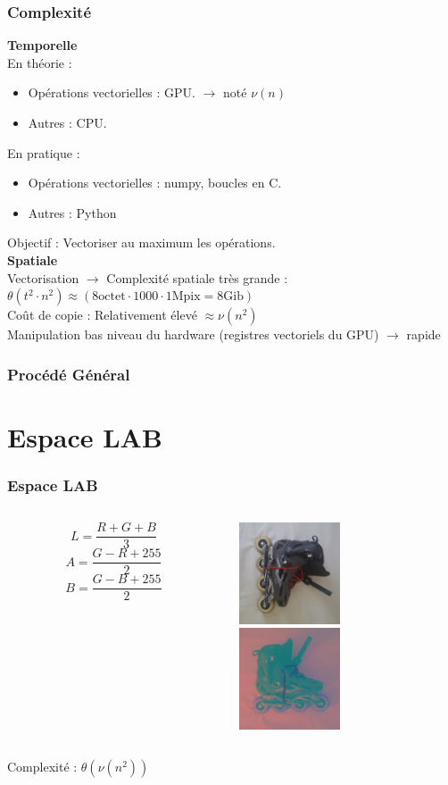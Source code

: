 \documentclass[french]{beamer}
\begin{document}
\begin{frame}
	\frametitle{Complexité}
	\textbf{Temporelle} \\
	\smallskip
	En théorie :
	\begin{itemize}
		\item Opérations vectorielles : GPU. \;\;\; $\longrightarrow$ noté $\nu(n)$
		\item Autres : CPU.
	\end{itemize}
	En pratique :
	\begin{itemize}
		\item Opérations vectorielles : numpy, boucles en C.
		\item Autres : Python
	\end{itemize}
	Objectif : Vectoriser au maximum les opérations. \\
	\bigskip
	\textbf{Spatiale} \\
	\smallskip
	Vectorisation $\longrightarrow$ Complexité spatiale très grande :\\
	$\theta(t^2 \cdot n^2) \approx (8\text{octet} \cdot 1000 \cdot 1\text{Mpix} = 8 \text{Gib})$ \\
	\smallskip
	Coût de copie : Relativement élevé $\approx \nu(n^2)$\\
	Manipulation bas niveau du hardware (registres vectoriels du GPU) $\longrightarrow$ rapide
\end{frame}

\begin{frame}
	\frametitle{Procédé Général}
	\tableofcontents
\end{frame}

\section{Espace LAB}

\begin{frame}
	\frametitle{Espace LAB}
	\begin{columns}
		\begin{column}{5cm}
			$$L = \frac{R + G + B}{3}$$
			$$A = \frac{G - R + 255}{2}$$
			$$B = \frac{G - B + 255}{2}$$
		\end{column}
		\begin{column}{5cm}
			\includegraphics[width=3cm]{images/roller.png}\\
			\includegraphics[width=3cm]{images/roller_lab.jpg}
		\end{column}
	\end{columns}
	Complexité : $\theta(\nu(n^2))$
\end{frame}
\end{document}
